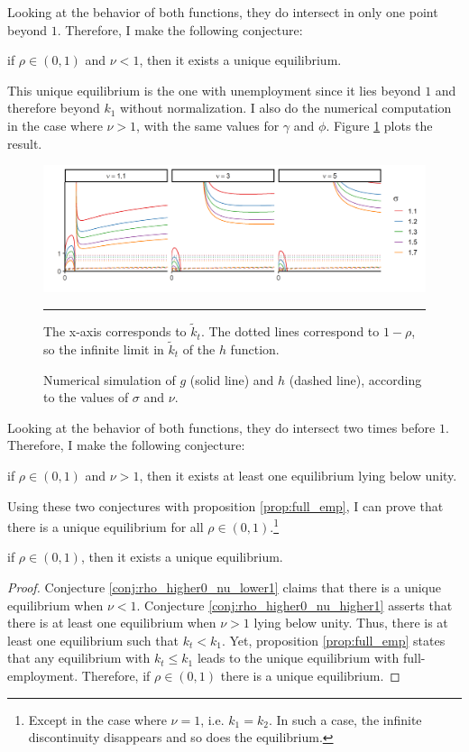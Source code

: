 Looking at the behavior of both functions, they do intersect in only one point beyond $1$. Therefore, I make the following conjecture:
\begin{conjecture}\label{conj:rho_higher0_nu_lower1}
	if $\rho \in (0,1)$ and $\nu < 1$, then it exists a unique equilibrium.
\end{conjecture}
This unique equilibrium is the one with unemployment since it lies beyond $1$ and therefore beyond $k_1$ without normalization. I also do the numerical computation in the case where $\nu > 1$, with the same values for $\gamma$ and $\phi$. Figure \ref{fig:gh1} plots the result.
\begin{figure}[tb]
	\centering
	\includegraphics[width = 1\linewidth]{../result/appendix_A/uniqueness/gc_all.png}
	\caption{Numerical simulation of $g$ (solid line) and $h$ (dashed line), according to the values of $\sigma$ and $\nu$.}
	\label{fig:gh1}
	\vspace{.5ex}
	\hrule
	\vspace{-4ex}
	\justify\singlespacing\footnotesize The x-axis corresponds to $\tilde{k}_t$. The dotted lines correspond to $1-\rho$, so the infinite limit in $\tilde{k}_t$ of the $h$ function.
\end{figure}
Looking at the behavior of both functions, they do intersect two times before $1$. Therefore, I make the following conjecture:
\begin{conjecture}\label{conj:rho_higher0_nu_higher1}
	if $\rho \in (0,1)$ and $\nu > 1$, then it exists at least one equilibrium lying below unity.
\end{conjecture}
Using these two conjectures with proposition \ref{prop:full_emp}, I can prove that there is a unique equilibrium for all $\rho \in (0,1)$.\footnote{Except in the case where $\nu = 1$, i.e. $k_1 = k_2$. In such a case, the infinite discontinuity disappears and so does the equilibrium.}
\begin{proposition}
	if $\rho \in (0,1)$, then it exists a unique equilibrium.
\end{proposition}
\begin{proof}
	Conjecture \ref{conj:rho_higher0_nu_lower1} claims that there is a unique equilibrium when $\nu < 1$. Conjecture \ref{conj:rho_higher0_nu_higher1} asserts that there is at least one equilibrium when $\nu > 1$ lying below unity. Thus, there is at least one equilibrium such that $k_t < k_1$. Yet, proposition \ref{prop:full_emp} states that any equilibrium with $k_t \leq k_1$ leads to the unique equilibrium with full-employment. Therefore, if $\rho \in (0,1)$ there is a unique equilibrium.
\end{proof}




